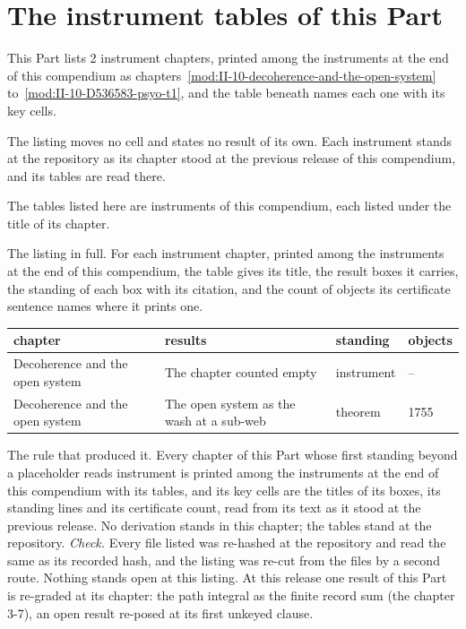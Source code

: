 \section{The instrument tables of this Part}\label{mod:III-L-the-instrument-tables-at-the-repository}
\begin{chtable}\label{box:III-L-the-instrument-tables-at-the-repository:1}
This Part lists 2 instrument chapters, printed among the instruments at the end of this compendium as chapters~\ref{mod:II-10-decoherence-and-the-open-system} to~\ref{mod:II-10-D536583-psyo-t1}, and the table beneath names each one with its key cells.
\end{chtable}
The listing moves no cell and states no result of its own. Each instrument stands at the repository as its chapter stood at the previous release of this compendium, and its tables are read there.
\begin{chbridge}
The tables listed here are instruments of this compendium, each listed under the title of its chapter.
\end{chbridge}
\begin{chproof}[instrument]
The listing in full. For each instrument chapter, printed among the instruments at the end of this compendium, the table gives its title, the result boxes it carries, the standing of each box with its citation, and the count of objects its certificate sentence names where it prints one.
{\small
\begin{longtable}{p{38mm}p{63mm}p{30mm}p{14mm}}
\hline
chapter & results & standing & objects \\
\hline
\endhead
Decoherence and the open system & The chapter counted empty & instrument & -- \\
Decoherence and the open system & The open system as the wash at a sub-web & theorem & 1755 \\
\hline
\end{longtable}
}
The rule that produced it. Every chapter of this Part whose first standing beyond a placeholder reads instrument is printed among the instruments at the end of this compendium with its tables, and its key cells are the titles of its boxes, its standing lines and its certificate count, read from its text as it stood at the previous release.
No derivation stands in this chapter; the tables stand at the repository.
\emph{Check.} Every file listed was re-hashed at the repository and read the same as its recorded hash, and the listing was re-cut from the files by a second route.
Nothing stands open at this listing. At this release one result of this Part is re-graded at its chapter: the path integral as the finite record sum (the chapter 3-7), an open result re-posed at its first unkeyed clause.
\end{chproof}
\label{chend:III-L-the-instrument-tables-at-the-repository}
